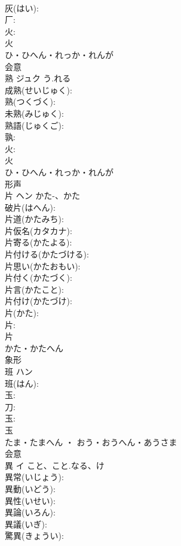 \documentclass[8pt]{extreport}
\begin{document}
\begin{CJK}{UTF8}{min}
\\	灰(はい): 
\\	厂: 
\\	火: 
\\	火	
\\	ひ・ひへん・れっか・れんが	
\\	会意 
\\	熟	ジュク	う.れる		
\\	成熟(せいじゅく): 
\\	熟(つくづく): 
\\	未熟(みじゅく): 
\\	熟語(じゅくご): 
\\	孰: 
\\	火: 
\\	火	
\\	ひ・ひへん・れっか・れんが	
\\	形声 
\\	片	ヘン	かた-、かた		
\\	破片(はへん): 
\\	片道(かたみち): 
\\	片仮名(カタカナ): 
\\	片寄る(かたよる): 
\\	片付ける(かたづける): 
\\	片思い(かたおもい): 
\\	片付く(かたづく): 
\\	片言(かたこと): 
\\	片付け(かたづけ): 
\\	片(かた): 
\\	片: 
\\	片	
\\	かた・かたへん	
\\	象形 
\\	班	ハン			
\\	班(はん): 
\\	玉: 
\\	刀: 
\\	玉: 
\\	玉	
\\	たま・たまへん ・ おう・おうへん・あうさま	
\\	会意 
\\	異	イ	こと、こと.なる、け		
\\	異常(いじょう): 
\\	異動(いどう): 
\\	異性(いせい): 
\\	異論(いろん): 
\\	異議(いぎ): 
\\	驚異(きょうい): 

\end{CJK}
\end{document}
